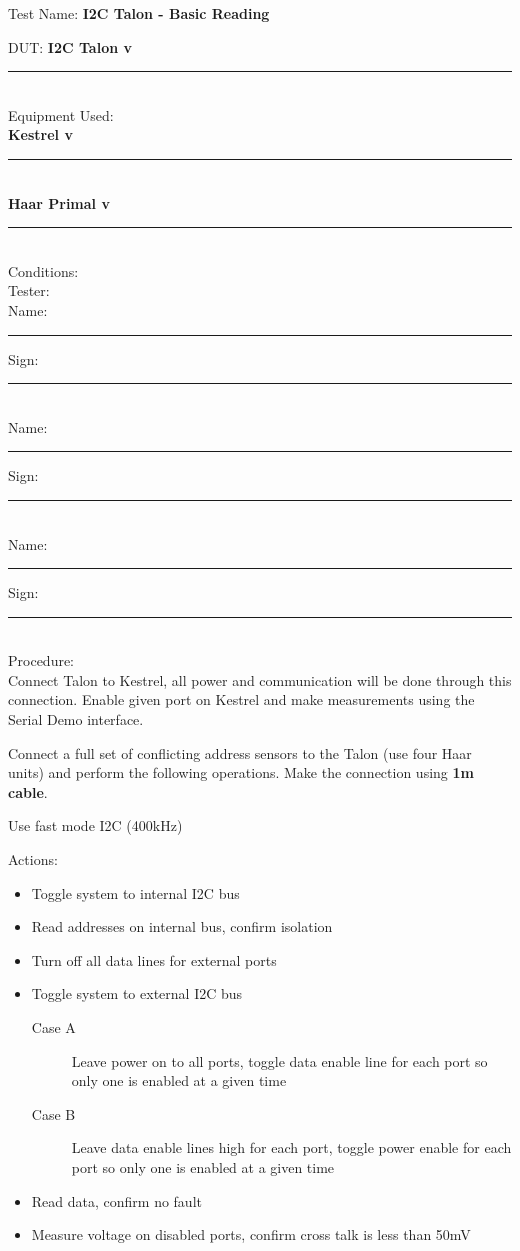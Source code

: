 \noindent
\setlength\parindent{0pt}

{\Huge Test Name: \textbf{I2C Talon - Basic Reading}}\\[20pt]
{\Large DUT: \textbf{I2C Talon v}\rule{1cm}{0.15mm}} \\[10pt]
{\Large Equipment Used: }\\[5pt]
\textbf{Kestrel v}\rule{1cm}{0.15mm}\\
\textbf{Haar Primal v}\rule{1cm}{0.15mm} \\[40pt]
{\Large Conditions: }\\[40pt]
{\Large Tester: }\\[10pt]
Name: \rule{4cm}{0.15mm} \hfill Sign: \rule{4cm}{0.15mm}\\[5pt]
Name: \rule{4cm}{0.15mm} \hfill Sign: \rule{4cm}{0.15mm}\\[5pt]
Name: \rule{4cm}{0.15mm} \hfill Sign: \rule{4cm}{0.15mm}\\[15pt]
{\Large Procedure: }\\
Connect Talon to Kestrel, all power and communication will be done through this connection. Enable given port on Kestrel and make measurements using the Serial Demo interface. 

Connect a full set of conflicting address sensors to the Talon (use four Haar units) and perform the following operations. Make the connection using \textbf{1m cable}.

Use fast mode I2C (400kHz)

{\large Actions:}
\begin{itemize}
\item Toggle system to internal I2C bus
\item Read addresses on internal bus, confirm isolation
\item Turn off all data lines for external ports
\item Toggle system to external I2C bus
\begin{description}
\item [Case A] Leave power on to all ports, toggle data enable line for each port so only one is enabled at a given time 
\item [Case B] Leave data enable lines high for each port, toggle power enable for each port so only one is enabled at a given time
\end{description}
\item Read data, confirm no fault
\item Measure voltage on disabled ports, confirm cross talk is less than 50mV
\end{itemize}

